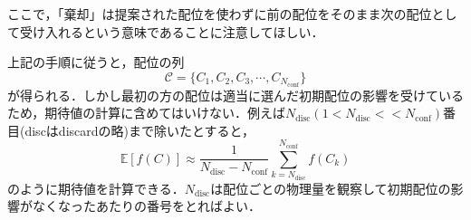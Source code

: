 \documentclass[a4paper,11pt]{jsarticle}
\begin{document}
ここで，「棄却」は提案された配位を使わずに前の配位をそのまま次の配位として受け入れるという意味であることに注意してほしい．\par
上記の手順に従うと，配位の列
\begin{equation}
  \mathcal{C} = \{ C_1,C_2,C_3,\cdots,C_{N_{\text{conf}}} \}
\end{equation}
が得られる．しかし最初の方の配位は適当に選んだ初期配位の影響を受けているため，期待値の計算に含めてはいけない．例えば$N_{\text{disc}}(1<N_{\text{disc}}<<N_{\text{conf}})$番目(discはdiscardの略)まで除いたとすると，
\begin{equation}
  \mathbb{E}[f(C)] \approx \frac{1}{N_{\text{disc}} - N_{\text{conf}}}\sum_{k=N_{\text{disc}}}^{N_{\text{conf}}}f(C_k)
\end{equation}
のように期待値を計算できる．$N_{\text{disc}}$は配位ごとの物理量を観察して初期配位の影響がなくなったあたりの番号をとればよい．
\end{document}
